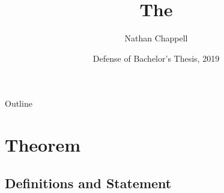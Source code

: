\documentclass{beamer}
\title %
{The \MWT}
\author %
{Nathan Chappell\inst{1}}
\institute %
{
	\inst{1}%
	Charles University\\
	Faculty of Mathematics and Physics
}
\date %
{Defense of Bachelor's Thesis, 2019}
\begin{document}
\begin{frame}
	\titlepage
\end{frame}

\begin{frame}{Outline}
	\tableofcontents
\end{frame}





\section{Theorem}

\subsection{Definitions and Statement}
%
%
\end{document}
